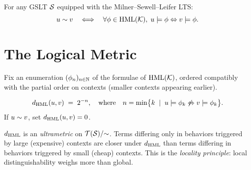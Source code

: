 \begin{theorem}[Adequacy]
For any GSLT $\mathcal{S}$ equipped with the Milner--Sewell--Leifer LTS:
\[
  u \sim v \quad\Longleftrightarrow\quad
  \forall \phi \in \mathrm{HML}(\mathcal{K}),\; u \models \phi \Leftrightarrow v \models \phi.
\]
\end{theorem}

\section{The Logical Metric}

Fix an enumeration $(\phi_n)_{n \in \mathbb{N}}$ of the formulae of $\mathrm{HML}(\mathcal{K})$,
ordered compatibly with the partial order on contexts (smaller contexts
appearing earlier).

\begin{definition}
\[
  d_{\mathrm{HML}}(u, v) \;=\; 2^{-n}, \quad\text{where}\quad
  n = \min\bigl\{k \;\mid\; u \models \phi_k \not\Leftrightarrow v \models \phi_k\bigr\}.
\]
If $u \sim v$, set $d_{\mathrm{HML}}(u, v) = 0$.
\end{definition}

\begin{proposition}
$d_{\mathrm{HML}}$ is an \emph{ultrametric} on $\mathcal{T}(\mathcal{S})/{\sim}$.
Terms differing only in behaviors triggered by large (expensive) contexts
are closer under $d_{\mathrm{HML}}$ than terms differing in behaviors triggered
by small (cheap) contexts.  This is the \emph{locality principle}: local
distinguishability weighs more than global.
\end{proposition}

